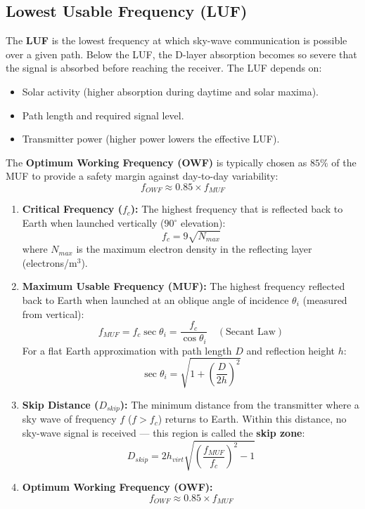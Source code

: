 \documentclass[12pt,a4paper]{article}
\begin{document}
\subsection{Lowest Usable Frequency (LUF)}
The \textbf{LUF} is the lowest frequency at which sky-wave communication is possible over a given path. Below the LUF, the D-layer absorption becomes so severe that the signal is absorbed before reaching the receiver. The LUF depends on:
\begin{itemize}[leftmargin=*, itemsep=2pt]
  \item Solar activity (higher absorption during daytime and solar maxima).
  \item Path length and required signal level.
  \item Transmitter power (higher power lowers the effective LUF).
\end{itemize}
The \textbf{Optimum Working Frequency (OWF)} is typically chosen as $85\%$ of the MUF to provide a safety margin against day-to-day variability:
\[
f_{OWF} \approx 0.85 \times f_{MUF}
\]

\begin{tcolorbox}[formulabox, title={\textbf{Key Sky-Wave Design Parameters}}]
\begin{enumerate}[leftmargin=*, label=\textbf{\arabic*.}, itemsep=3pt, topsep=1pt]
  \item \textbf{Critical Frequency ($f_c$):} The highest frequency that is reflected back to Earth when launched vertically ($90^\circ$ elevation):
  \[
  f_c = 9\sqrt{N_{max}}
  \]
  where $N_{max}$ is the maximum electron density in the reflecting layer (electrons/m$^3$).
  \item \textbf{Maximum Usable Frequency (MUF):} The highest frequency reflected back to Earth when launched at an oblique angle of incidence $\theta_i$ (measured from vertical):
  \[
  f_{MUF} = f_c \sec\theta_i = \frac{f_c}{\cos\theta_i} \quad (\text{Secant Law})
  \]
  For a flat Earth approximation with path length $D$ and reflection height $h$:
  \[
  \sec\theta_i = \sqrt{1 + \left(\frac{D}{2h}\right)^{\!2}}
  \]
  \item \textbf{Skip Distance ($D_{skip}$):} The minimum distance from the transmitter where a sky wave of frequency $f$ ($f > f_c$) returns to Earth. Within this distance, no sky-wave signal is received — this region is called the \textbf{skip zone}:
  \[
  D_{skip} = 2 h_{virt} \sqrt{\left(\frac{f_{MUF}}{f_c}\right)^{\!2} - 1}
  \]
  \item \textbf{Optimum Working Frequency (OWF):}
  \[
  f_{OWF} \approx 0.85 \times f_{MUF}
  \]
\end{enumerate}
\end{tcolorbox}
\end{document}
